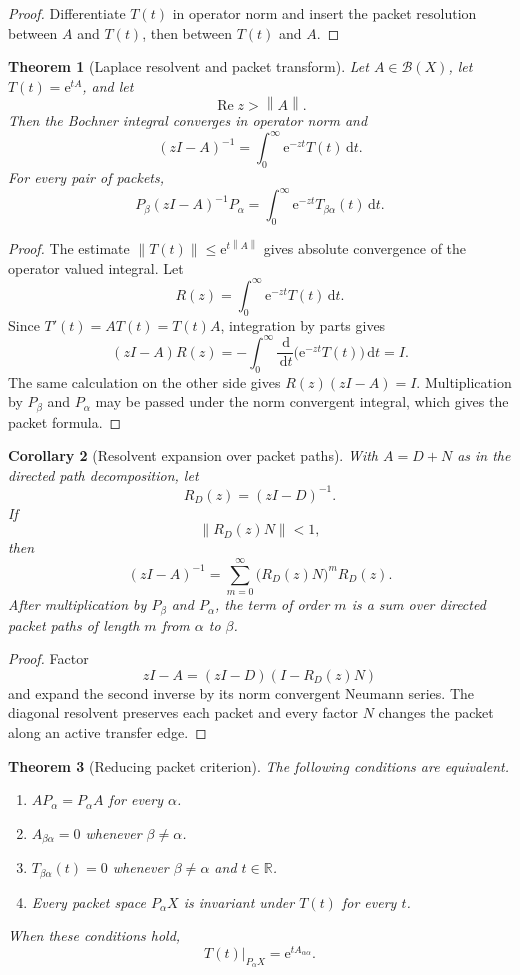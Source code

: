 \documentclass[11pt,a4paper]{article}
\newtheorem{theorem}{Theorem}[section]
\newtheorem{corollary}[theorem]{Corollary}
\theoremstyle{definition}
\theoremstyle{remark}
\newcommand{\norm}[1]{\left\lVert#1\right\rVert}
\newcommand{\RR}{\mathbb R}
\newcommand{\e}{\mathrm e}
\newcommand{\dd}{\,\mathrm d}
\begin{document}
\begin{proof}
Differentiate \(T(t)\) in operator norm and insert the packet resolution between \(A\) and \(T(t)\), then between \(T(t)\) and \(A\).
\end{proof}

\begin{theorem}[Laplace resolvent and packet transform]\label{extended:record:005}\label{extended:thm:laplace_packet_resolvent}
Let \(A\in\mathcal B(X)\), let \(T(t)=\e^{tA}\), and let
\[
\operatorname{Re}z>\norm A.
\]
Then the Bochner integral converges in operator norm and
\[
(zI-A)^{-1}
=
\int_0^\infty \e^{-zt}T(t)\dd t.
\]
For every pair of packets,
\[
P_\beta(zI-A)^{-1}P_\alpha
=
\int_0^\infty
\e^{-zt}T_{\beta\alpha}(t)\dd t.
\]
\end{theorem}

\begin{proof}
The estimate \(\norm{T(t)}\leq\e^{t\norm A}\) gives absolute convergence of the operator valued integral. Let
\[
R(z)=\int_0^\infty\e^{-zt}T(t)\dd t.
\]
Since \(T'(t)=AT(t)=T(t)A\), integration by parts gives
\[
(zI-A)R(z)
=
-\int_0^\infty
\frac{\dd}{\dd t}
\bigl(\e^{-zt}T(t)\bigr)
\dd t
=I.
\]
The same calculation on the other side gives
\(
R(z)(zI-A)=I
\).
Multiplication by \(P_\beta\) and \(P_\alpha\) may be passed under the norm convergent integral, which gives the packet formula.
\end{proof}

\begin{corollary}[Resolvent expansion over packet paths]\label{extended:record:006}\label{extended:cor:resolvent_packet_paths}
With \(A=D+N\) as in the directed path decomposition, let
\[
R_D(z)=(zI-D)^{-1}.
\]
If
\[
\norm{R_D(z)N}<1,
\]
then
\[
(zI-A)^{-1}
=
\sum_{m=0}^\infty
\bigl(R_D(z)N\bigr)^mR_D(z).
\]
After multiplication by \(P_\beta\) and \(P_\alpha\), the term of order \(m\) is a sum over directed packet paths of length \(m\) from \(\alpha\) to \(\beta\).
\end{corollary}

\begin{proof}
Factor
\[
zI-A=(zI-D)(I-R_D(z)N)
\]
and expand the second inverse by its norm convergent Neumann series. The diagonal resolvent preserves each packet and every factor \(N\) changes the packet along an active transfer edge.
\end{proof}

\begin{theorem}[Reducing packet criterion]\label{extended:record:007}\label{extended:thm:reducing_packets}
The following conditions are equivalent.
\begin{enumerate}
\item \(AP_\alpha=P_\alpha A\) for every \(\alpha\).
\item \(A_{\beta\alpha}=0\) whenever \(\beta\neq\alpha\).
\item \(T_{\beta\alpha}(t)=0\) whenever \(\beta\neq\alpha\) and \(t\in\RR\).
\item Every packet space \(P_\alpha X\) is invariant under \(T(t)\) for every \(t\).
\end{enumerate}
When these conditions hold,
\[
T(t)|_{P_\alpha X}
=
\e^{tA_{\alpha\alpha}}.
\]
\end{theorem}
\end{document}
